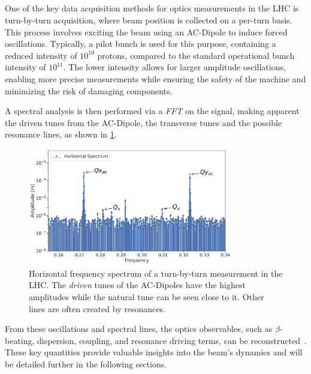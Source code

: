 \subsection{}

One of the key data acquisition methods for optics measurements in the LHC is turn-by-turn
acquisition, where beam position is collected on a per-turn basis. This process involves exciting
the beam using an AC-Dipole to induce forced oscillations. Typically, a pilot bunch is used for
this purpose, containing a reduced intensity of $10^{10}$ protons, compared to the standard
operational bunch intensity of $10^{11}$. The lower intensity allows for larger amplitude
oscillations, enabling more precise measurements while ensuring the safety of the machine and
minimizing the risk of damaging components.

A spectral analysis is then performed via a \textit{FFT} on the signal, making apparent the driven
tunes from the AC-Dipole, the transverse tunes and the possible resonance lines, as shown in
\cref{fig:optics_measurements:tbt_data:spectrum}.

\begin{figure}[!htb]
    \centering
    \includegraphics[width=0.8\textwidth]{./images/basic_spectrum.pdf}
    \caption{Horizontal frequency spectrum of a turn-by-turn measurement in the LHC. The 
    \textit{driven} tunes of the AC-Dipoles have the highest amplitudes while the natural tune can
    be seen close to it. Other lines are often created by resonances.}
    \label{fig:optics_measurements:tbt_data:spectrum}
\end{figure}

From these oscillations and  spectral lines, the optics observables, such as $\beta$-beating,
dispersion, coupling, and resonance driving terms, can be
reconstructed~\cite{catalan-lasheras_linear_2004}. These key quantities provide valuable insights
into the beam's dynamics and will be detailed further in the following sections.

